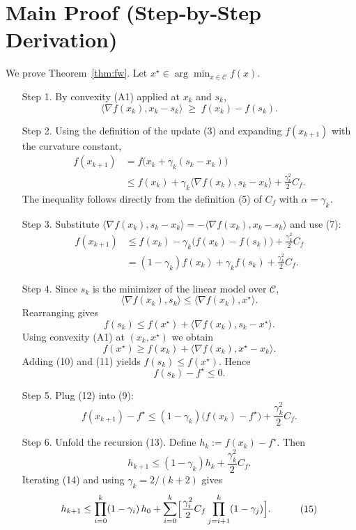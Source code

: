 \documentclass{article}
\begin{document}
\section*{Main Proof (Step‑by‑Step Derivation)}
We prove Theorem~\ref{thm:fw}.  
Let $x^\star\in\arg\min_{x\in\mathcal{C}}f(x)$.

\begin{enumerate}
\item[Step 1.] By convexity (A1) applied at $x_k$ and $s_k$,
\[
\langle\nabla f(x_k),x_k-s_k\rangle \;\ge\; f(x_k)-f(s_k).
\tag{7}
\]

\item[Step 2.] Using the definition of the update (3) and expanding $f(x_{k+1})$ with the curvature constant,
\[
\begin{aligned}
f(x_{k+1})
&= f\bigl(x_k+\gamma_k(s_k-x_k)\bigr) \\
&\le f(x_k) + \gamma_k\langle\nabla f(x_k),s_k-x_k\rangle
     + \frac{\gamma_k^{2}}{2}C_f .
\end{aligned}
\tag{8}
\]
The inequality follows directly from the definition (5) of $C_f$ with $\alpha=\gamma_k$.

\item[Step 3.] Substitute $\langle\nabla f(x_k),s_k-x_k\rangle = -\langle\nabla f(x_k),x_k-s_k\rangle$ and use (7):
\[
\begin{aligned}
f(x_{k+1})
&\le f(x_k) - \gamma_k\bigl(f(x_k)-f(s_k)\bigr) + \frac{\gamma_k^{2}}{2}C_f\\
&= (1-\gamma_k)f(x_k) + \gamma_k f(s_k) + \frac{\gamma_k^{2}}{2}C_f .
\end{aligned}
\tag{9}
\]

\item[Step 4.] Since $s_k$ is the minimizer of the linear model over $\mathcal{C}$,
\[
\langle\nabla f(x_k),s_k\rangle \le \langle\nabla f(x_k),x^\star\rangle .
\]
Rearranging gives
\[
f(s_k) \le f(x^\star) + \langle\nabla f(x_k),s_k-x^\star\rangle .
\tag{10}
\]
Using convexity (A1) at $(x_k,x^\star)$ we obtain
\[
f(x^\star) \ge f(x_k) + \langle\nabla f(x_k),x^\star-x_k\rangle .
\tag{11}
\]
Adding (10) and (11) yields $f(s_k)\le f(x^\star)$. Hence
\[
f(s_k)-f^\star \le 0 .
\tag{12}
\]

\item[Step 5.] Plug (12) into (9):
\[
f(x_{k+1})-f^\star \le (1-\gamma_k)\bigl(f(x_k)-f^\star\bigr) + \frac{\gamma_k^{2}}{2}C_f .
\tag{13}
\]

\item[Step 6.] Unfold the recursion (13). Define $h_k:=f(x_k)-f^\star$. Then
\[
h_{k+1}\le (1-\gamma_k)h_k + \frac{\gamma_k^{2}}{2}C_f .
\tag{14}
\]
Iterating (14) and using $\gamma_k=2/(k+2)$ gives
\[
\begin{aligned}
h_{k+1}
&\le \prod_{i=0}^{k}(1-\gamma_i)\,h_0
     + \sum_{i=0}^{k}\Bigl[\frac{\gamma_i^{2}}{2}C_f\prod_{j=i+1}^{k}(1-\gamma_j)\Bigr].
\end{aligned}
\tag{15}
\]


\end{enumerate}
\end{document}
